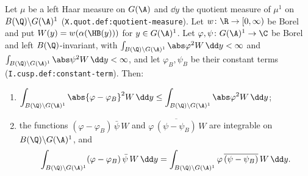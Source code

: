 Let $\mu$ be a left Haar measure on $G(\A)$ and $\dd y$ the quotient measure of $\mu^1$ on $B(\Q)\backslash G(\A)^1$ (\texttt{X.quot.def:quotient-measure}). Let
$w\colon\R\to[0,\infty)$ be Borel and put $W(y)=w(\alpha(\HB(y)))$ for $y\in G(\A)^1$. Let $\varphi,\psi\colon G(\A)^1\to\C$ be Borel and left $B(\Q)$-invariant, with
$\int_{B(\Q)\backslash G(\A)^1}\abs\varphi^2W\,\dd y<\infty$ and $\int_{B(\Q)\backslash G(\A)^1}\abs\psi^2W\,\dd y<\infty$, and let $\varphi_B,\psi_B$ be their constant terms
(\texttt{I.cusp.def:constant-term}). Then:
\begin{enumerate}
  \item[(a)] $\displaystyle\int_{B(\Q)\backslash G(\A)^1}\abs{\varphi-\varphi_B}^2W\,\dd y\le\int_{B(\Q)\backslash G(\A)^1}\abs\varphi^2W\,\dd y$;
  \item[(b)] the functions $(\varphi-\varphi_B)\,\bar\psi\,W$ and $\varphi\,\overline{(\psi-\psi_B)}\,W$ are integrable on $B(\Q)\backslash G(\A)^1$, and
  \[
    \int_{B(\Q)\backslash G(\A)^1}(\varphi-\varphi_B)\,\bar\psi\,W\,\dd y=\int_{B(\Q)\backslash G(\A)^1}\varphi\,\overline{(\psi-\psi_B)}\,W\,\dd y .
  \]
\end{enumerate}
